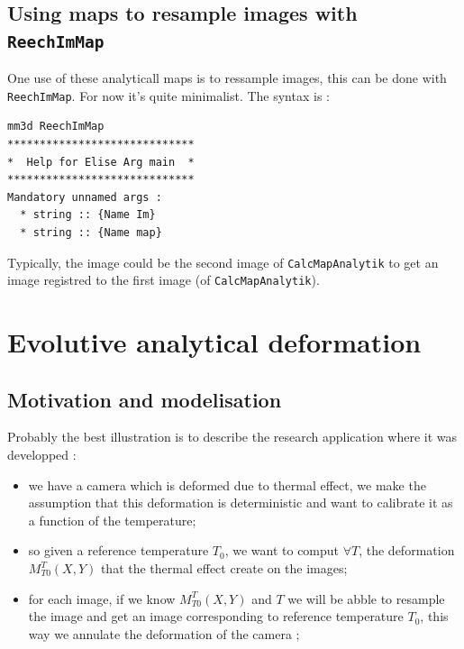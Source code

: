 
\subsection{Using maps to resample images with {\tt ReechImMap}}

\label{ReechImMap}

One use of these analyticall maps is to ressample images,
this can be done with {\tt  ReechImMap}. For now it's quite minimalist. 
The syntax is :

\begin{verbatim}
mm3d ReechImMap
*****************************
*  Help for Elise Arg main  *
*****************************
Mandatory unnamed args : 
  * string :: {Name Im}
  * string :: {Name map}
\end{verbatim}

Typically, the image could be the second image of {\tt CalcMapAnalytik} 
to get an image registred to the first image (of {\tt CalcMapAnalytik}).


\section{Evolutive analytical deformation}

\label{EvolutiveMap}

\subsection{Motivation and modelisation}

Probably the best illustration is to describe the research application where it
was developped :

\begin{itemize}
   \item we have a camera which is deformed due to thermal effect, we make
        the assumption that this deformation is deterministic and want to calibrate it as a
        function of the temperature;

   \item so given a reference temperature $T_0$, we want to comput $\forall T$, the deformation
         $M^T_{T0}(X,Y)$  that the thermal effect create on the images;

   \item for each image, if we know $M^T_{T0}(X,Y)$ and $T$  we will be abble to resample the image
         and get an image corresponding to reference temperature $T_0$,
         this way we annulate the deformation of the camera ;
         
\end{itemize}

